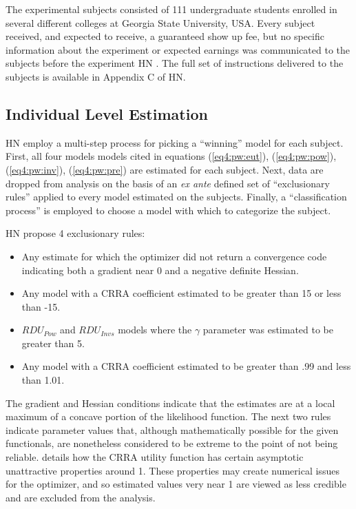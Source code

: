 \documentclass[../main.tex]{subfiles}
\begin{document}
The experimental subjects consisted of 111 undergraduate students enrolled in several different colleges at Georgia State University, USA.
Every subject received, and expected to receive, a guaranteed  show up fee, but no specific information about the experiment or expected earnings was communicated to the subjects before the experiment HN \parencite*[98]{Harrison2016}.
The full set of instructions delivered to the subjects is available in Appendix C of HN.

\subsection{Individual Level Estimation}
\label{sec4:ILE}

HN employ a multi-step process for picking a \enquote{winning} model for each subject.
First, all four models models cited in equations (\ref{eq4:pw:eut}), (\ref{eq4:pw:pow}), (\ref{eq4:pw:inv}), (\ref{eq4:pw:pre}) are estimated for each subject.
Next, data are dropped from analysis on the basis of an \textit{ex ante} defined set of \enquote{exclusionary rules} applied to every model estimated on the subjects.
Finally, a \enquote{classification process} is employed to choose a model with which to categorize the subject.

HN propose 4 exclusionary rules:
\begin{itemize}
	\item Any estimate for which the optimizer did not return a convergence code indicating both a gradient near 0 and a negative definite Hessian.
	\item Any model with a CRRA coefficient estimated to be greater than 15 or less than -15.
	\item $\mathit{RDU_{Pow}}$ and $\mathit{RDU_{Invs}}$ models where the $\gamma$ parameter was estimated to be greater than 5.
	\item Any model with a CRRA coefficient estimated to be greater than .99 and less than 1.01.
\end{itemize}

\noindent The gradient and Hessian conditions indicate that the estimates are at a local maximum of a concave portion of the likelihood function.
The next two rules indicate parameter values that, although mathematically possible for the given functionals, are nonetheless considered to be extreme to the point of not being reliable.
\textcite{Wakker2008} details how the CRRA utility function has certain asymptotic unattractive properties around 1.
These properties may create numerical issues for the optimizer, and so estimated values very near 1 are viewed as less credible and are excluded from the analysis.
\end{document}
